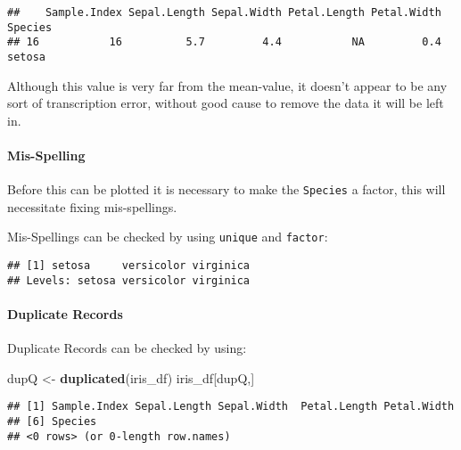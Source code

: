 \documentclass[
]{article}
\newenvironment{Shaded}{\begin{snugshade}}{\end{snugshade}}
\newcommand{\KeywordTok}[1]{\textcolor[rgb]{0.13,0.29,0.53}{\textbf{#1}}}
\newcommand{\NormalTok}[1]{#1}
\newcommand{\OperatorTok}[1]{\textcolor[rgb]{0.81,0.36,0.00}{\textbf{#1}}}
\newcommand{\StringTok}[1]{\textcolor[rgb]{0.31,0.60,0.02}{#1}}
\begin{document}
\begin{verbatim}
##    Sample.Index Sepal.Length Sepal.Width Petal.Length Petal.Width Species
## 16           16          5.7         4.4           NA         0.4  setosa
\end{verbatim}

Although this value is very far from the mean-value, it doesn't appear
to be any sort of transcription error, without good cause to remove the
data it will be left in.

\hypertarget{mis-spelling}{%
\paragraph{Mis-Spelling}\label{mis-spelling}}

Before this can be plotted it is necessary to make the \texttt{Species}
a factor, this will necessitate fixing mis-spellings.

Mis-Spellings can be checked by using \texttt{unique} and
\texttt{factor}:

\begin{Shaded}
\end{Shaded}

\begin{verbatim}
## [1] setosa     versicolor virginica 
## Levels: setosa versicolor virginica
\end{verbatim}

\hypertarget{duplicate-records}{%
\paragraph{Duplicate Records}\label{duplicate-records}}

Duplicate Records can be checked by using:

\begin{Shaded}
\begin{Highlighting}[]
\NormalTok{dupQ <{-}}\StringTok{ }\KeywordTok{duplicated}\NormalTok{(iris\_df)}
\NormalTok{iris\_df[dupQ,]}
\end{Highlighting}
\end{Shaded}

\begin{verbatim}
## [1] Sample.Index Sepal.Length Sepal.Width  Petal.Length Petal.Width 
## [6] Species     
## <0 rows> (or 0-length row.names)
\end{verbatim}
\end{document}
